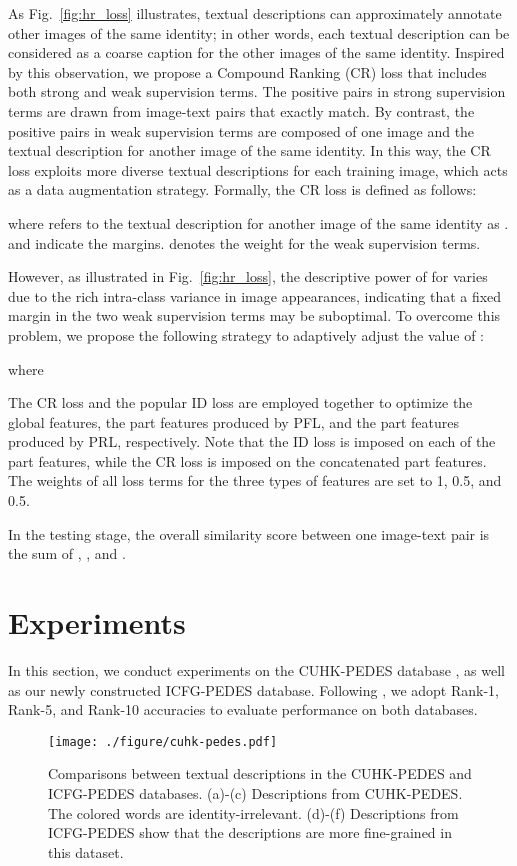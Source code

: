 \documentclass[journal]{IEEEtran}
\begin{document}
As Fig.~\ref{fig:hr_loss} illustrates, textual descriptions can approximately annotate other images of the same identity; in other words, each textual description can be considered as a coarse caption for the other images of the same identity. Inspired by this observation, we propose a Compound Ranking (CR) loss that includes both strong and weak supervision terms. The positive pairs in strong supervision terms are drawn from image-text pairs that exactly match. By contrast, the positive pairs in weak supervision terms are composed of one image and the textual description for another image of the same identity. In this way, the CR loss exploits more diverse textual descriptions for each training image, which acts as a data augmentation strategy. Formally, the CR loss is defined as follows:

where  refers to the textual description for another image of the same identity as .  and  indicate the margins.  denotes the weight for the weak supervision terms.

However, as illustrated in Fig.~\ref{fig:hr_loss}, the descriptive power of  for  varies due to the rich intra-class variance in image appearances, indicating that a fixed margin in the two weak supervision terms may be suboptimal. To overcome this problem, we propose the following strategy to adaptively adjust the value of :

where


The CR loss and the popular ID loss \cite{zheng2020dual} are employed together to optimize the global features, the part features produced by PFL, and the part features produced by PRL, respectively. Note that the ID loss is imposed on each of the  part features, while the CR loss is imposed on the concatenated  part features. The weights of all loss terms for the three types of features are set to 1, 0.5, and 0.5.

In the testing stage, the overall similarity score between one image-text pair is the sum of , , and .


\section{Experiments}\label{Experiments}
In this section, we conduct experiments on the CUHK-PEDES database \cite{li2017person}, as well as our newly constructed ICFG-PEDES database.
Following \cite{li2017person}, we adopt Rank-1, Rank-5, and Rank-10 accuracies to evaluate performance on both databases.

\begin{figure}[t]
\begin{center}
\texttt{[image: ./figure/cuhk-pedes.pdf]}
\end{center}
   \caption{Comparisons between textual descriptions in the CUHK-PEDES and ICFG-PEDES databases. (a)-(c) Descriptions from CUHK-PEDES. The colored words are identity-irrelevant. (d)-(f) Descriptions from ICFG-PEDES show that the descriptions are more fine-grained in this dataset.}
\label{fig:cuhk-pedes}
\end{figure}
\end{document}
